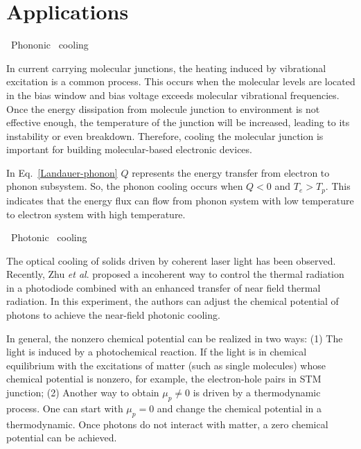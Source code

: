 \documentclass[aps
,twocolumn
,floatfix,footinbib]{revtex4-1}
\begin{document}
\section{Applications}

\bullet \ Phononic \ cooling

In current carrying molecular junctions, the heating induced by vibrational excitation is a common process\cite{yu2004inelastic,galperin2007molecular,huang2007local,ioffe2008detection,hartle2011vibrational,simine2012vibrational}. This occurs when the molecular levels are located in the bias window and bias voltage exceeds molecular vibrational frequencies. Once the energy dissipation from molecule junction to environment is not effective enough, the temperature of the junction will be increased, leading to its instability or even breakdown. Therefore, cooling the molecular junction is important for building molecular-based electronic devices\cite{galperin2009cooling,hartle2011resonant,hartle2018cooling}.

In Eq.~\ref{Landauer-phonon} $Q$ represents the energy transfer from electron to phonon subsystem. So, the phonon cooling occurs when $Q<0$ and $T_{e}>T_{p}$. This indicates that the energy flux can flow from phonon system with low temperature to electron system with high temperature. 

\bullet \ Photonic \ cooling

The optical cooling of solids driven by coherent laser light has been observed\cite{epstein1995observation}. Recently, Zhu \emph{et al}. proposed a incoherent way to control the thermal radiation in a photodiode combined with an enhanced transfer of near field thermal radiation\cite{zhu2019near}. In this experiment, the authors can adjust the chemical potential of photons to achieve the near-field photonic cooling.

In general, the nonzero chemical potential can be realized in two ways\cite{herrmann2005light}: (1) The light is induced by a photochemical reaction. If the light is in chemical
equilibrium with the excitations of matter (such as single molecules) whose chemical
potential is nonzero, for example, the electron-hole pairs in STM junction; (2) Another way to obtain $\mu_{p}\neq 0$ is driven by a thermodynamic process. One can start with $\mu_{p}=0$ and change the chemical potential in a thermodynamic. Once photons do not interact with matter, a zero chemical potential can be achieved. 
\end{document}
